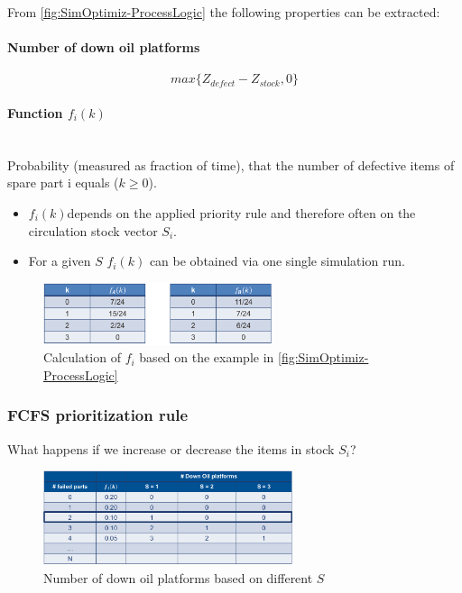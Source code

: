 From \autoref{fig:SimOptimiz-ProcessLogic} the following properties can be
extracted:

\paragraph{Number of down oil platforms}
\begin{equation}
max\{Z_{defect} - Z_{stock}, 0\}
\end{equation}

\paragraph{Function $f_i(k)$}\mbox{}\\
Probability (measured as fraction of time), that the number of
defective items of spare part i equals ($k\ge0$).

\begin{itemize}
	\tightlist
	\item $f_i(k)$depends on the applied priority rule and therefore often on
	the circulation stock vector $S_i$. 
	\item For a given $S$ $f_i(k)$ can be obtained via one single simulation
	run.
\end{itemize}

\begin{figure}[H]
	\centering
	\includegraphics[width=0.6\textwidth]{figures/SimOptimiz_fi.png}
	\caption{Calculation of $f_i$ based on the example in
	\autoref{fig:SimOptimiz-ProcessLogic}}
\end{figure}

\subsubsection{FCFS prioritization rule}

What happens if we increase or decrease the items in stock $S_i$?

\begin{figure}[H]
	\centering
	\includegraphics[width=0.65\textwidth]{figures/FCFSPrioritization.png}
	\caption{Number of down oil platforms based on different $S$}
\end{figure}

